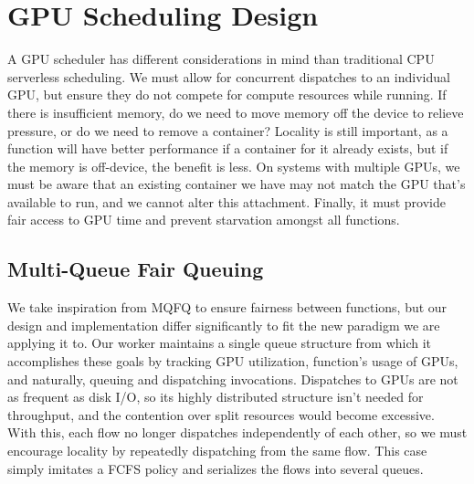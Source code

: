 \section{GPU Scheduling Design}
\vspace*{\subsecspace}
\label{sec:design}

A GPU scheduler has different considerations in mind than traditional CPU serverless scheduling.
We must allow for concurrent dispatches to an individual GPU, but ensure they do not compete for compute resources while running.
If there is insufficient memory, do we need to move memory off the device to relieve pressure, or do we need to remove a container?
Locality is still important, as a function will have better performance if a container for it already exists, but if the memory is off-device, the benefit is less.  
On systems with multiple GPUs, we must be aware that an existing container we have may not match the GPU that's available to run, and we cannot alter this attachment.
Finally, it must provide fair access to GPU time and prevent starvation amongst all functions.

\subsection{Multi-Queue Fair Queuing}
\label{sec:queuing}

We take inspiration from MQFQ to ensure fairness between functions, but our design and implementation differ significantly to fit the new paradigm we are applying it to.
Our worker maintains a single queue structure from which it accomplishes these goals by tracking GPU utilization, function's usage of GPUs, and naturally, queuing and dispatching invocations.
Dispatches to GPUs are not as frequent as disk I/O, so its highly distributed structure isn't needed for throughput, and the contention over split resources would become excessive.
With this, each flow no longer dispatches independently of each other, so we must encourage locality by repeatedly dispatching from the same flow.
This case simply imitates a FCFS policy and serializes the flows into several queues.


